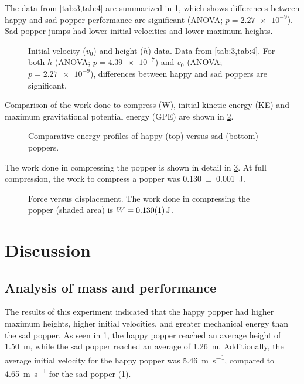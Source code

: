 \documentclass[reprint,amsmath,amssymb,aps,twoside]{revtex4-2} %
\begin{document}
The data from \cref{tab:3,tab:4} are summarized in \cref{fig:56}, which shows differences between happy and sad popper performance are significant (ANOVA; $p=\num{2.27e-9}$). Sad popper jumps had lower initial velocities and lower maximum heights. 
\begin{figure}
\begin{center}

\end{center}
\caption{Initial velocity ($v_0$) and height ($h$) data. Data from \cref{tab:3,tab:4}. For both $h$ (ANOVA; $p=\num{4.39e-7}$) and $v_0$ (ANOVA; $p=\num{2.27e-9}$), differences between happy and sad poppers are significant.}
\label{fig:56}
\end{figure}

Comparison of the work done to compress (W), initial kinetic energy (KE) and maximum gravitational potential energy (GPE) are shown in \cref{fig:7}. 
\begin{figure}
\begin{center}


\end{center}
\caption{Comparative energy profiles of happy (top) versus sad (bottom) poppers.}
\label{fig:7}
\end{figure}

The work done in compressing the popper is shown in detail in \cref{fig:9}. At full compression, the work to compress a popper was \qty{0.130\pm0.001}{\joule}. 
\begin{figure}
\begin{center}

\end{center}
\caption{Force versus displacement. The work done in compressing the popper (shaded area) is $W=\qty{0.130\pm0.001}{\joule}$.}
\label{fig:9}
\end{figure}






\section{Discussion}

\subsection{Analysis of mass and performance}
The results of this experiment indicated that the happy popper had higher maximum heights, higher initial velocities, and greater mechanical energy than the sad popper. As seen in \cref{fig:56}, the happy popper reached an average height of \qty{1.50}{\meter}, while the sad popper reached an average of \qty{1.26}{\meter}. Additionally, the average initial velocity for the happy popper was \qty{5.46}{\meter\per\second}, compared to \qty{4.65}{\meter\per\second} for the sad popper (\cref{fig:56}). 
\end{document}
